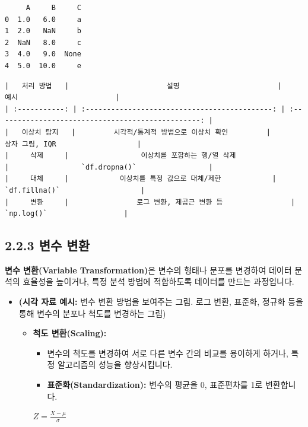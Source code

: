 \documentclass[
  letterpaper,
]{book}
\providecommand{\tightlist}{%
  \setlength{\itemsep}{0pt}\setlength{\parskip}{0pt}}
\begin{document}
\begin{verbatim}
     A     B     C
0  1.0   6.0     a
1  2.0   NaN     b
2  NaN   8.0     c
3  4.0   9.0  None
4  5.0  10.0     e
\end{verbatim}

\begin{verbatim}
|   처리 방법   |                       설명                       |                       예시                       |
| :-----------: | :--------------------------------------------: | :------------------------------------------------: |
|   이상치 탐지   |         시각적/통계적 방법으로 이상치 확인         |                   상자 그림, IQR                   |
|     삭제     |                 이상치를 포함하는 행/열 삭제                 |                 `df.dropna()`                 |
|     대체     |            이상치를 특정 값으로 대체/제한            |                   `df.fillna()`                   |
|     변환     |                로그 변환, 제곱근 변환 등                |                  `np.log()`                  |
\end{verbatim}

\subsection{2.2.3 변수 변환}\label{uxbcc0uxc218-uxbcc0uxd658}

\textbf{변수 변환(Variable Transformation)}은 변수의 형태나 분포를
변경하여 데이터 분석의 효율성을 높이거나, 특정 분석 방법에 적합하도록
데이터를 만드는 과정입니다.

\begin{itemize}
\item
  \textbf{(시각 자료 예시:} 변수 변환 방법을 보여주는 그림. 로그 변환,
  표준화, 정규화 등을 통해 변수의 분포나 척도를 변경하는 그림)

  \begin{itemize}
  \tightlist
  \item
    \textbf{척도 변환(Scaling):}

    \begin{itemize}
    \tightlist
    \item
      변수의 척도를 변경하여 서로 다른 변수 간의 비교를 용이하게 하거나,
      특정 알고리즘의 성능을 향상시킵니다.
    \item
      \textbf{표준화(Standardization):} 변수의 평균을 0, 표준편차를 1로
      변환합니다.
    \end{itemize}

    \(Z = \frac{X - \mu}{\sigma}\)
  \end{itemize}
\end{itemize}
\end{document}
